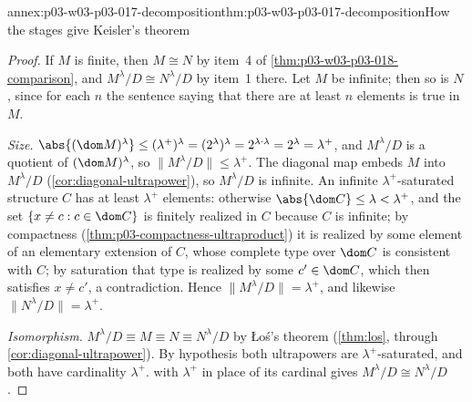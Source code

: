 \begin{annexitem}{annex:p03-w03-p03-017-decomposition}{thm:p03-w03-p03-017-decomposition}{How the stages give Keisler's theorem}
\begin{proof}
If \(M\) is finite, then \(M\cong N\) by item~4 of
\cref{thm:p03-w03-p03-018-comparison}, and \(M^\lambda/D\cong N^\lambda/D\)
by item~1 there.  Let \(M\) be infinite; then so is \(N\), since for each
\(n\) the sentence saying that there are at least \(n\) elements is true in
\(M\).

\emph{Size.}  \(\abs{(\dom M)^\lambda}\le(\lambda^+)^\lambda
=(2^\lambda)^\lambda=2^{\lambda\cdot\lambda}=2^\lambda=\lambda^+\), and
\(M^\lambda/D\) is a quotient of \((\dom M)^\lambda\), so
\(\lVert M^\lambda/D\rVert\le\lambda^+\).  The diagonal map embeds \(M\)
into \(M^\lambda/D\) (\cref{cor:diagonal-ultrapower}), so \(M^\lambda/D\) is
infinite.  An infinite \(\lambda^+\)-saturated structure \(C\) has at least
\(\lambda^+\) elements: otherwise \(\abs{\dom C}\le\lambda<\lambda^+\), and
the set \(\{x\ne c:c\in\dom C\}\) is finitely realized in \(C\) because
\(C\) is infinite; by compactness
(\cref{thm:p03-compactness-ultraproduct}) it is realized by some element of
an elementary extension of \(C\), whose complete type over \(\dom C\) is
consistent with \(C\); by saturation that type is realized by some
\(c'\in\dom C\), which then satisfies \(x\ne c'\), a contradiction.  Hence
\(\lVert M^\lambda/D\rVert=\lambda^+\), and likewise
\(\lVert N^\lambda/D\rVert=\lambda^+\).

\emph{Isomorphism.}  \(M^\lambda/D\equiv M\equiv N\equiv N^\lambda/D\) by
\L o\'s's theorem (\cref{thm:los}, through \cref{cor:diagonal-ultrapower}).
By hypothesis both ultrapowers are \(\lambda^+\)-saturated, and both have
cardinality \(\lambda^+\).
 with \(\lambda^+\) in place of
its cardinal gives \(M^\lambda/D\cong N^\lambda/D\).
\end{proof}
\end{annexitem}

